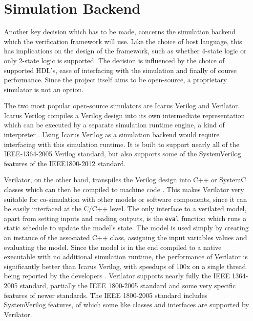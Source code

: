 \section{Simulation Backend} %

Another key decision which has to be made, concerns the simulation backend which the verification framework will use.
Like the choice of host language, this has implications on the design of the framework, such as whether 4-state logic
or only 2-state logic is supported.
The decision is influenced by the choice of supported HDL's, ease of interfacing with the simulation and
finally of course performance. Since the project itself aims to be open-source, a proprietary simulator
is not an option.

The two most popular open-source simulators are Icarus Verilog and Verilator. Icarus Verilog
compiles a Verilog design into its own intermediate representation which can be executed by a separate simulation
runtime engine, a kind of interpreter \cite{iverilog}. Using Icarus Verilog as a simulation backend would require
interfacing with this simulation runtime. It is built to support nearly all of the IEEE-1364-2005 Verilog standard,
but also supports some of the SystemVerilog features of the IEEE1800-2012 standard.

Verilator, on the other hand, transpiles the Verilog design into C++ or SystemC classes which can then be compiled
to machine code \cite{verilator}. This makes Verilator very suitable for co-simulation with other models
or software components, since it can be easily interfaced at the C/C++ level. The only interface to a verilated
model, apart from setting inputs and reading outputs, is the \texttt{eval} function which runs a static schedule to
update the model's state. The model is used simply by creating an instance of the associated C++ class, assigning the
input variables values and evaluating the model. Since the model is in the end compiled to a native executable with
no additional simulation
runtime, the performance of Verilator is significantly better than Icarus Verilog, with speedups of 100x on a single
thread being reported by the developers \cite{verilator}. Verilator supports nearly fully the IEEE 1364-2005
standard, partially the IEEE 1800-2005 standard and some very specific features of newer standards. The IEEE
1800-2005 standard includes SystemVerilog features, of which some like classes and interfaces are supported by Verilator.

